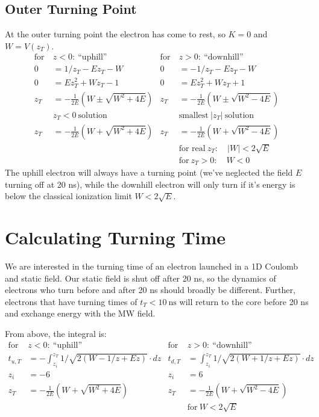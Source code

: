 \documentclass[aps,pra,preprint,groupedaddress]{revtex4-1}
\begin{document}
\subsection{\label{sec:zT} Outer Turning Point}

At the outer turning point the electron has come to rest, so $K=0$ and $W = V(z_T)$.
\begin{align*}
\text{for} ~ & z < 0: ~ \text{``uphill''} & \text{for} ~ & z > 0: ~ \text{``downhill''} \\
0 & = 1/z_T - Ez_T - W & 0 & = -1/z_T - Ez_T - W \\
0 & = Ez_T^2 + Wz_T - 1 & 0 & = Ez_T^2 + Wz_T + 1 \\
z_T & = -\frac{1}{2E} \left(W \pm \sqrt{W^2 + 4E}\right) & z_T & = -\frac{1}{2E} \left(W \pm \sqrt{W^2 - 4E}\right) \\
 & z_T < 0 ~ \text{solution} & & \text{smallest} ~ |z_T| ~ \text{solution} \\
z_T & = -\frac{1}{2E} \left(W + \sqrt{W^2 + 4E}\right) & z_T & = -\frac{1}{2E} \left(W + \sqrt{W^2 - 4E}\right) \\
 & & & \text{for real} ~ z_T: \quad |W| < 2\sqrt{E} \\
 & & & \text{for} ~ z_T > 0: \quad W < 0
\end{align*}
The uphill electron will always have a turning point (we've neglected the field $E$ turning off at 20 ns), while the downhill electron will only turn if it's energy is below the classical ionization limit $W < 2\sqrt{E}$.

\section{\label{sec:calct} Calculating Turning Time}

We are interested in the turning time of an electron launched in a 1D Coulomb and static field. Our static field is shut off after 20 ns, so the dynamics of electrons who turn before and after 20 ns should broadly be different. Further, electrons that have turning times of $t_T < 10 ~ \text{ns}$ will return to the core before 20 ns and exchange energy with the MW field.

From above, the integral is:
\begin{align*}
\text{for} ~ & z < 0: ~ \text{``uphill''} & \text{for} ~ & z > 0: ~ \text{``downhill''} \\
t_{u,T} & = - \int_{z_i}^{z_T} 1/\sqrt{2(W - 1/z + Ez)} \cdot dz & t_{d,T} & = \int_{z_i}^{z_T} 1/\sqrt{2(W + 1/z + Ez)} \cdot dz \\
z_i & = -6 & z_i & = 6 \\
z_T & = -\frac{1}{2E} \left(W + \sqrt{W^2 + 4E}\right) & z_T & = -\frac{1}{2E} \left(W + \sqrt{W^2 - 4E}\right) \\
 & & & \text{for} ~ W < 2 \sqrt{E}
\end{align*}
\end{document}
